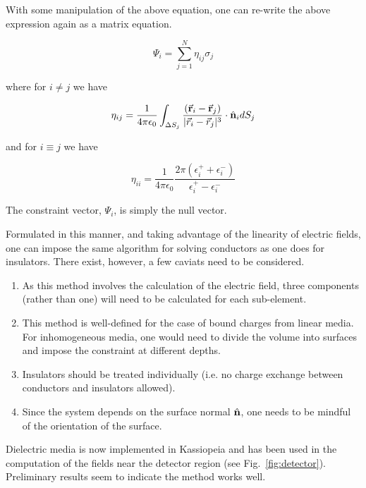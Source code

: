 With some manipulation of the above equation, one can re-write the above expression again as a matrix equation.

\begin{equation}
\Psi_i = \sum_{j=1}^{N} \eta_{ij} \sigma_j
\end{equation}

\noindent where for $i\neq j$ we have

\begin{equation}
\eta_{ij} = \frac{1}{4\pi\epsilon_0}\int_{\Delta S_j} \frac{(\vec{\bf r}_i - \vec{\bf r}_j)}{|\vec{r}_i - \vec{r}_j|^3} \cdot \hat{\bf n}_i dS_j
\end{equation}

\noindent and for $i\equiv j$ we have

\begin{equation}
\eta_{ii} = \frac{1}{4\pi\epsilon_0}\frac{2\pi (\epsilon^+_i + \epsilon^-_i)}{\epsilon^+_i - \epsilon^-_i}
\end{equation}

The constraint vector, $\Psi_i$, is simply the null vector.

Formulated in this manner, and taking advantage of the linearity of electric fields, one can impose the same algorithm for solving conductors as one does for insulators.  There exist, however, a few caviats need to be considered.

\begin{enumerate}
\item As this method involves the calculation of the electric field, three components (rather than one) will need to be calculated for each sub-element.
\item This method is well-defined for the case of bound charges from linear media.  For inhomogeneous media, one would need to divide the volume into surfaces and impose the constraint at different depths.
\item Insulators should be treated individually (i.e. no charge exchange between conductors and insulators allowed).
\item Since the system depends on the surface normal $\hat{\bf n}$, one needs to be mindful of the orientation of the surface.
\end{enumerate}

Dielectric media is now implemented in Kassiopeia and has been used in the computation of the fields near the detector region (see Fig.~\ref{fig:detector}).  Preliminary results seem to indicate the method works well.
